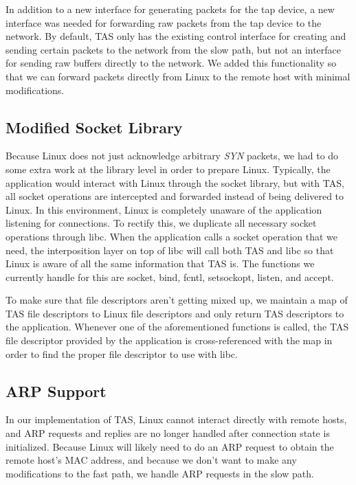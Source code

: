 In addition to a new interface for generating packets for the tap device, a new
interface was needed for forwarding raw packets from the tap device to the 
network. By default, TAS only has the existing control interface for 
creating and sending certain packets to the network from the slow path, but 
not an interface for sending raw buffers directly to the network. We added this
functionality so that we can forward packets directly from Linux to the remote
host with minimal modifications.

\subsection{Modified Socket Library}

Because Linux does not just acknowledge arbitrary \textit{SYN} packets, we had to do some
extra work at the library level in order to prepare Linux. Typically, the 
application would interact with Linux through the socket library, but with 
TAS, all socket operations are intercepted and forwarded instead of being
delivered to Linux. In this environment, Linux is completely unaware of the 
application listening for connections. To rectify this, we duplicate all 
necessary socket operations through libc. When the application calls a socket 
operation that we need, the interposition layer on top of libc will call both 
TAS and libc so that Linux is aware of all the same information that 
TAS is. The functions we currently handle for this are socket, bind, 
fcntl, setsockopt, listen, and accept. 

To make sure that file descriptors aren't getting mixed up, we maintain a map
of TAS file descriptors to Linux file descriptors and only return TAS
descriptors to the application. Whenever one of the aforementioned functions is 
called, the TAS file descriptor provided by the application is 
cross-referenced with the map in order to find the proper file descriptor to use
with libc. 

\subsection{ARP Support}

In our implementation of TAS, Linux cannot interact directly with remote 
hosts, and ARP requests and replies are no longer handled after connection state
is initialized. Because Linux will likely need to do an ARP request to obtain 
the remote host's MAC address, and because we don't want to make any 
modifications to the fast path, we handle ARP requests in the slow path.


